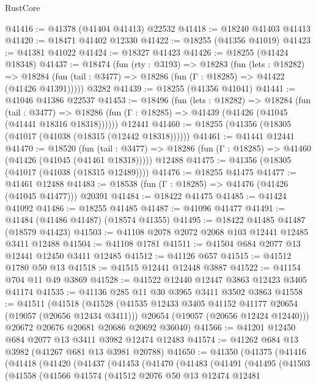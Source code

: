 \begin{lexlean}{RustCore}
\begin{coremodule}
@41416 := @41378 (@41404 @41413) @22532
@41418 := @18240 @41403 @41413
@41420 := @18471 @41402 @12330
@41422 := @18255 (@41356 @41019)
@41423 := @41381 @41022
@41424 := @18327 @41423
@41426 := @18255 (@41424 @18348)
@41437 := @18474
    (fun (rty : @3193) =>
    @18283
      (fun (lets : @18282) =>
      @18284 (fun (tail : @3477) => @18286 (fun (Γ : @18285) => @41422 (@41426 @41391)))))
    @3282
@41439 := @18255 (@41356 @41041)
@41441 := @41046 @41386 @22537
@41453 := @18496
    (fun (lets : @18282) =>
    @18284
      (fun (tail : @3477) =>
      @18286 (fun (Γ : @18285) => @41439 (@41426 (@41045 (@41441 @18316 @18318))))))
    @12441
@41460 := @18255 (@41356 (@18305 (@41017 (@41038 (@18315 (@12442 @18318))))))
@41461 := @41441 @12441
@41470 := @18520
    (fun (tail : @3477) => @18286 (fun (Γ : @18285) => @41460 (@41426 (@41045 (@41461 @18318)))))
    @12488
@41475 := @41356 (@18305 (@41017 (@41038 (@18315 @12489))))
@41476 := @18255 @41475
@41477 := @41461 @12488
@41483 := @18538 (fun (Γ : @18285) => @41476 (@41426 (@41045 @41477))) @20391
@41484 := @18422 @41475
@41485 := @41424 @41092
@41486 := @18255 @41485
@41487 := @41096 @41477
@41491 := @41484 (@41486 @41487) (@18574 @41355)
@41495 := @18422 @41485 @41487 (@18579 @41423)
@41503 := @41108 @2078 @2072 @2068 @103 @12441 @12485 @3411 @12488
@41504 := @41108 @1781
@41511 := @41504 @684 @2077 @13 @12441 @12450 @3411 @12485
@41512 := @41126 @657
@41515 := @41512 @1780 @50 @13
@41518 := @41515 @12441 @12448 @3887
@41522 := @41154 @704 @11 @49 @3869
@41528 := @41522 @12440 @12447 @3863 @12423 @3405 @41174
@41535 := @41136 @285 @11 @30 @3965 @3411 @3502 @3863
@41558 := @41511
    (@41518
      (@41528
        (@41535 @12433 @3405 @41152 @41177 @20654 (@19057 (@20656 @12434 @3411)))
        @20654
        (@19057 (@20656 @12424 @12440)))
      @20672
      @20676
      @20681
      @20686
      @20692
      @36040)
@41566 := @41201 @12450 @684 @2077 @13 @3411 @3982 @12474 @12483
@41574 := @41262 @684 @13 @3982 (@41267 @681 @13 @3981 @20788)
@41650 := @41350
    (@41375
      (@41416
        (@41418
          (@41420
            (@41437
              (@41453
                (@41470
                  (@41483
                    (@41491
                      (@41495
                        (@41503
                          (@41558
                            (@41566
                              @41574
                              (@41512
                                @2076
                                @50
                                @13
                                @12474
                                @12481

\end{coremodule}
\end{lexlean}
